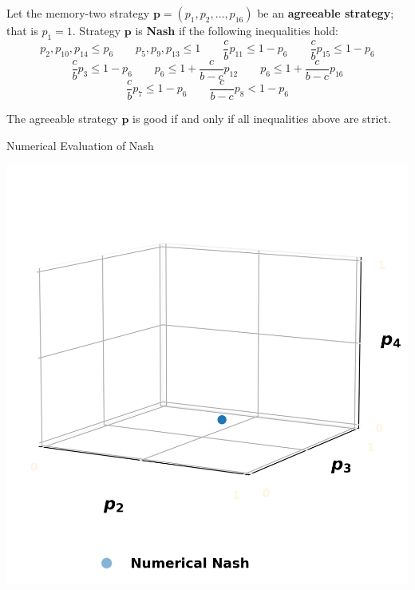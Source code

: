\documentclass{beamer}
\begin{document}
\begin{frame}
    \footnotesize{
    \begin{theorem}
        Let the memory-two strategy \(\mathbf{p} = (p_{1}, p_{2}, \dots, p_{16})\) be an \textbf{agreeable
        strategy}; that is \(p_1 = 1\). Strategy \(\mathbf{p}\) is \textbf{Nash} if the
        following inequalities hold:
        \begin{equation*}
            p_2, p_{10}, p_{14}  \leq  p_{6}  \qquad  p_5, p_9, p_{13}  \leq 1 \qquad  \frac{c}{b} p_{11} \leq 1 - p_{6}  \qquad  \frac{c}{b} p_{15} \leq 1 - p_{6} 
        \end{equation*}
        \begin{equation*}
            \frac{c}{b} p_{3} \leq 1 - p_{6}  \qquad  p_6  \leq 1 + \frac{c}{b - c} p_{12} \qquad  p_6  \leq 1 + \frac{c}{b - c} p_{16}
        \end{equation*}
        \begin{equation*}
             \frac{c}{b} p_{7} \leq 1 - p_6  \qquad \frac{c}{b -c} p_{8} < 1 - p_6
        \end{equation*}

        The agreeable strategy \(\mathbf{p}\) is good if and only if all inequalities above are strict.
    \end{theorem}}
\end{frame}

\begin{frame}
    \begin{center}
        \Large Numerical Evaluation of Nash
    \end{center}
\end{frame}

\begin{frame}
    \begin{center}
        \includegraphics[width=.65\textwidth]{static/two}
    \end{center}
\end{frame}
\end{document}

